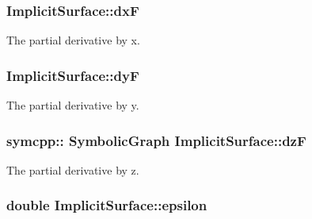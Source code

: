 \subsubsection[{\texorpdfstring{dxF}{dxF}}]{ Implicit\+Surface\+::dxF\hspace{0.3cm}{\ttfamily [private]}}\hypertarget{classImplicitSurface_a9861b92609a363bf78d73347a9272b5d}{}\label{classImplicitSurface_a9861b92609a363bf78d73347a9272b5d}


The partial derivative by x. 

\subsubsection[{\texorpdfstring{dyF}{dyF}}]{ Implicit\+Surface\+::dyF\hspace{0.3cm}{\ttfamily [private]}}\hypertarget{classImplicitSurface_a49145c0375f0adc02157b9368e733aa2}{}\label{classImplicitSurface_a49145c0375f0adc02157b9368e733aa2}


The partial derivative by y. 

\subsubsection[{\texorpdfstring{dzF}{dzF}}]{\setlength{\rightskip}{0pt plus 5cm}symcpp\+:: Symbolic\+Graph Implicit\+Surface\+::dzF\hspace{0.3cm}{\ttfamily [private]}}\hypertarget{classImplicitSurface_aab31834ea321e276bb85348d7a7464f2}{}\label{classImplicitSurface_aab31834ea321e276bb85348d7a7464f2}


The partial derivative by z. 

\subsubsection[{\texorpdfstring{epsilon}{epsilon}}]{\setlength{\rightskip}{0pt plus 5cm}double Implicit\+Surface\+::epsilon\hspace{0.3cm}{\ttfamily [private]}}\hypertarget{classImplicitSurface_aa870a11380d4bc4c019d9d250e7ccc9c}{}\label{classImplicitSurface_aa870a11380d4bc4c019d9d250e7ccc9c}
